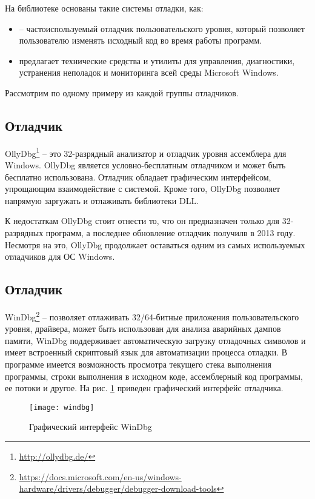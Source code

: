 \noindent На библиотеке  основаны такие системы отладки, как:
\begin{itemize}
	\item {} -- частоиспользуемый отладчик пользовательского уровня, который позволяет пользователю изменять исходный код во время работы программ.
	\item {} предлагает технические средства и утилиты для управления, диагностики, устранения неполадок и мониторинга всей среды Microsoft Windows.
\end{itemize}

Рассмотрим по одному примеру из каждой группы отладчиков.

\subsection{Отладчик }

OllyDbg\footnote{\url{http://ollydbg.de/}} -- это 32-разрядный анализатор и отладчик уровня ассемблера для Windows. OllyDbg является условно-бесплатным отладчиком и может быть бесплатно использована. Отладчик обладает графическим интерфейсом, упрощающим взаимодействие с системой. Кроме того, OllyDbg позволяет напрямую заргужать и отлаживать библиотеки DLL.

К недостаткам OllyDbg стоит отнести то, что он предназначен только для 32-разрядных программ, а последнее обновление отладчик получилв в 2013 году. Несмотря на это, OllyDbg продолжает оставаться одним из самых используемых отладчиков для ОС Windows.

\subsection{Отладчик }

WinDbg\footnote{\url{https://docs.microsoft.com/en-us/windows-hardware/drivers/debugger/debugger-download-tools}} -- позволяет отлаживать 32/64-битные приложения пользовательского уровня, драйвера, может быть использован для анализа аварийных дампов памяти, WinDbg поддерживает автоматическую загрузку отладочных символов и имеет встроенный скриптовый язык для автоматизации процесса отладки. В программе имеется возможность просмотра текущего стека выполнения программы, строки выполнения в исходном коде, ассемблерный код программы, ее потоки и другое. На рис. \ref{fig:windbg} приведен графический интерфейс отладчика.

\begin{figure}[H]
	\texttt{[image: windbg]}
	\caption{Графический интерфейс WinDbg}
	\label{fig:windbg}
\end{figure}

